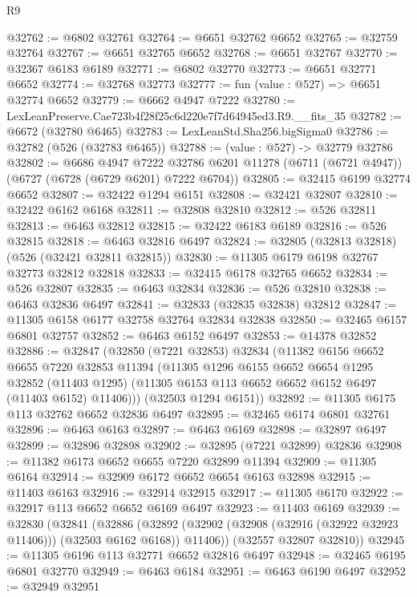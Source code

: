 \begin{lexlean}{R9}
\begin{coremodule}
@32762 := @6802 @32761
@32764 := @6651 @32762 @6652
@32765 := @32759 @32764
@32767 := @6651 @32765 @6652
@32768 := @6651 @32767
@32770 := @32367 @6183 @6189
@32771 := @6802 @32770
@32773 := @6651 @32771 @6652
@32774 := @32768 @32773
@32777 := fun (value : @527) => @6651 @32774 @6652
@32779 := @6662 @4947 @7222
@32780 := LexLeanPreserve.Cae723b4f28f25c6d220e7f7d64945ed3.R9.__fits_35
@32782 := @6672 (@32780 @6465)
@32783 := LexLeanStd.Sha256.bigSigma0
@32786 := @32782 (@526 (@32783 @6465))
@32788 := (value : @527) -> @32779 @32786
@32802 := @6686
    @4947
    @7222
    @32786
    @6201
    @11278
    (@6711 (@6721 @4947))
    (@6727 (@6728 (@6729 @6201) @7222 @6704))
@32805 := @32415 @6199 @32774 @6652
@32807 := @32422 @1294 @6151
@32808 := @32421 @32807
@32810 := @32422 @6162 @6168
@32811 := @32808 @32810
@32812 := @526 @32811
@32813 := @6463 @32812
@32815 := @32422 @6183 @6189
@32816 := @526 @32815
@32818 := @6463 @32816 @6497
@32824 := @32805 (@32813 @32818) (@526 (@32421 @32811 @32815))
@32830 := @11305 @6179 @6198 @32767 @32773 @32812 @32818
@32833 := @32415 @6178 @32765 @6652
@32834 := @526 @32807
@32835 := @6463 @32834
@32836 := @526 @32810
@32838 := @6463 @32836 @6497
@32841 := @32833 (@32835 @32838) @32812
@32847 := @11305 @6158 @6177 @32758 @32764 @32834 @32838
@32850 := @32465 @6157 @6801 @32757
@32852 := @6463 @6152 @6497
@32853 := @14378 @32852
@32886 := @32847
    (@32850
      (@7221 @32853)
      @32834
      (@11382
        @6156
        @6652
        @6655
        @7220
        @32853
        @11394
        (@11305
          @1296
          @6155
          @6652
          @6654
          @1295
          @32852
          (@11403 @1295)
          (@11305 @6153 @113 @6652 @6652 @6152 @6497 (@11403 @6152) @11406)))
      (@32503 @1294 @6151))
@32892 := @11305 @6175 @113 @32762 @6652 @32836 @6497
@32895 := @32465 @6174 @6801 @32761
@32896 := @6463 @6163
@32897 := @6463 @6169
@32898 := @32897 @6497
@32899 := @32896 @32898
@32902 := @32895 (@7221 @32899) @32836
@32908 := @11382 @6173 @6652 @6655 @7220 @32899 @11394
@32909 := @11305 @6164
@32914 := @32909 @6172 @6652 @6654 @6163 @32898
@32915 := @11403 @6163
@32916 := @32914 @32915
@32917 := @11305 @6170
@32922 := @32917 @113 @6652 @6652 @6169 @6497
@32923 := @11403 @6169
@32939 := @32830
    (@32841
      (@32886
        (@32892 (@32902 (@32908 (@32916 (@32922 @32923 @11406))) (@32503 @6162 @6168)) @11406))
      (@32557 @32807 @32810))
@32945 := @11305 @6196 @113 @32771 @6652 @32816 @6497
@32948 := @32465 @6195 @6801 @32770
@32949 := @6463 @6184
@32951 := @6463 @6190 @6497
@32952 := @32949 @32951

\end{coremodule}
\end{lexlean}
